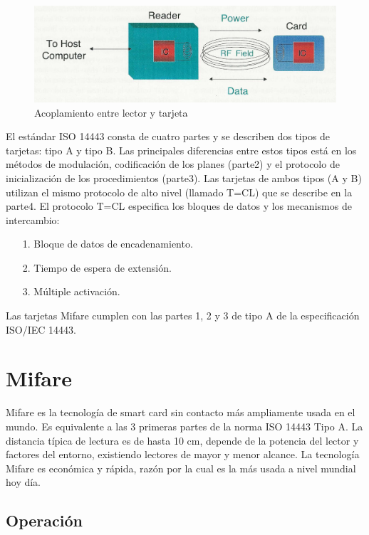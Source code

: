 \begin{figure}[H]
\centering
  \begin{center}
  \includegraphics[scale=.2]{Imagenes/sc2.jpg} 
  \end{center}
  \caption{Acoplamiento entre lector y tarjeta}\label{Fig:RFID3} 
\end{figure}

El estándar ISO 14443 consta de cuatro partes y se describen dos tipos de tarjetas: tipo A y tipo B. Las principales diferencias entre estos tipos está en los métodos de modulación, codificación de los planes (parte2) y el protocolo de inicialización de los procedimientos (parte3). Las tarjetas de ambos tipos (A y B) utilizan el mismo protocolo de alto nivel (llamado T=CL) que se describe en la parte4. El protocolo T=CL especifica los bloques de datos y los mecanismos de intercambio:

\begin{itemize}
\item[1.] Bloque de datos de encadenamiento.
\item[2.] Tiempo de espera de extensión.
\item[3.] Múltiple activación.
\end{itemize}

Las tarjetas Mifare cumplen con las partes 1, 2 y 3 de tipo A de la especificación ISO/IEC 14443.


\section{Mifare}

Mifare es la tecnología de smart card sin contacto más ampliamente usada en el mundo. Es equivalente a las 3 primeras partes de la norma ISO 14443 Tipo A. La distancia típica de lectura es de hasta 10 cm, depende de la potencia del lector y factores del entorno, existiendo lectores de mayor y menor alcance.
La tecnología Mifare es económica y rápida, razón por la cual es la más usada a nivel mundial hoy día.


\subsection{Operación}

